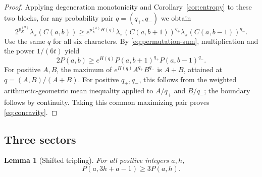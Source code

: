 \documentclass[11pt]{article}
\newtheorem{lemma}[theorem]{Lemma}
\theoremstyle{definition}
\theoremstyle{remark}
\numberwithin{equation}{section}
\begin{document}
\begin{proof}
Applying degeneration monotonicity and Corollary~\ref{cor:entropy}
to these two blocks, for any probability pair $q=(q_+,q_-)$ we obtain
\[
 2^{p_X^{(\pi)}}\lambda_\pi(C(a,b))
 \geq e^{p_X^{(\pi)}H(q)}
 \lambda_\pi(C(a,b+1))^{q_+}
 \lambda_\pi(C(a,b-1))^{q_-}.
\]
Use the same $q$ for all six characters. By \eqref{eq:permutation-sum},
multiplication and the power $1/(6t)$ yield
\[
 2P(a,b)\geq e^{H(q)}P(a,b+1)^{q_+}P(a,b-1)^{q_-}.
\]
For positive $A,B$, the maximum of $e^{H(q)}A^{q_+}B^{q_-}$ is
$A+B$, attained at $q=(A,B)/(A+B)$. For positive $q_+,q_-$, this follows
from the weighted arithmetic-geometric mean inequality applied to
$A/q_+$ and $B/q_-$; the boundary follows by continuity.
Taking this common maximizing pair proves
\eqref{eq:concavity}.
\end{proof}

\subsection{Three sectors}

\begin{lemma}[Shifted tripling]\label{lem:tripling}
For all positive integers $a,h$,
\begin{equation}\label{eq:tripling}
 P(a,3h+a-1)\geq3P(a,h).
\end{equation}
\end{lemma}
\end{document}
